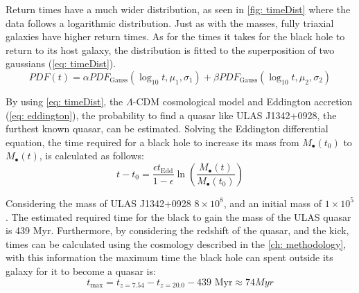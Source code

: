 	Return times have a much wider distribution, as seen in \autoref{fig: timeDist} where the data follows a logarithmic distribution. Just as with the masses, fully triaxial galaxies have higher return times. As for the times it takes for the black hole to return to its host galaxy, the distribution is fitted to the superposition of two gaussians (\autoref{eq: timeDist}).
	\begin{equation}\label{eq: timeDist}
		PDF(t) = \alpha PDF_\text{Gauss}(\log_{10}t, \mu_1, \sigma_1) + \beta PDF_\text{Gauss}(\log_{10}t, \mu_2, \sigma_2)
	\end{equation}
	
	By using \autoref{eq: timeDist}, the $\Lambda$-CDM cosmological model and Eddington accretion (\autoref{eq: eddington}), the probability to find a quasar like ULAS J1342+0928, the furthest known quasar, can be estimated. Solving the Eddington differential equation, the time required for a black hole to increase its mass from $M_\bullet(t_0)$ to $M_\bullet(t)$, is calculated as follows:
	\begin{equation}
		t - t_0 = \dfrac{\epsilon t_\text{Edd}}{1 - \epsilon}\ln\left(\dfrac{M_\bullet(t)}{M_\bullet(t_0)}\right)
	\end{equation}
	
	Considering the mass of ULAS J1342+0928 $8\times10^8$, and an initial mass of $1\times10^5$ \sm \cite{banados2018800}. The estimated required time for the black to gain the mass of the ULAS quasar is 439 Myr. Furthermore, by considering the redshift of the quasar, and the kick, times can be calculated using the cosmology described in the \autoref{ch: methodology}, with this information the maximum time the black hole can spent outside its galaxy for it to become a quasar is:
	\begin{equation}
		t_\text{max} = t_{z = 7.54} - t_{z = 20.0} - 439\text{ Myr} \approx 74 Myr
	\end{equation}
	
